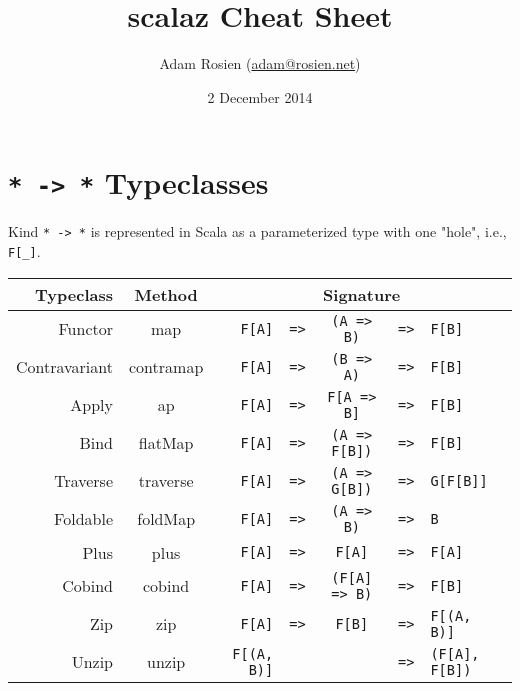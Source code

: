 \documentclass{tufte-handout}
\title{scalaz Cheat Sheet}
\author[Adam Rosien]{Adam Rosien (\href{mailto:adam@rosien.net}{adam@rosien.net})}
\date{2 December 2014}  %
\newcommand{\fa}{\texttt{F[A]}}
\newcommand{\fb}{\texttt{F[B]}}
\newcommand{\rarr}{\texttt{=>}}
\begin{document}
\maketitle%


\section{\texttt{* -> *} Typeclasses}\label{sec:sigs}

Kind \texttt{* -> *} is represented in Scala as a parameterized type with one "hole", i.e., \texttt{F[\_]}.

\begin{table}[ht]
  \centering
  \selectfont
  \begin{tabular}{rcrlccl}
    Typeclass & Method & \multicolumn{5}{c}{Signature} \\
    \midrule
    Functor       & map & \fa & \rarr & \texttt{(A => B)} & \rarr & \fb \\
    Contravariant & contramap & \fa & \rarr & \texttt{(B => A)} & \rarr & \fb \\
    Apply         & ap & \fa & \rarr & \texttt{F[A => B]} & \rarr & \fb \\
    Bind          & flatMap & \fa & \rarr & \texttt{(A => F[B])} & \rarr & \fb \\
    Traverse      & traverse & \fa & \rarr & \texttt{(A => G[B])} & \rarr & \texttt{G[F[B]]} \\
    Foldable      & foldMap & \fa & \rarr & \texttt{(A => B)} & \rarr & \texttt{B} \\
    Plus          & plus & \fa & \rarr & \fa & \rarr & \fa \\
    Cobind        & cobind & \fa & \rarr & \texttt{(F[A] => B)} & \rarr & \fb \\
    Zip           & zip & \fa & \rarr & \fb & \rarr & \texttt{F[(A, B)]} \\
    Unzip         & unzip & \texttt{F[(A, B)]} & & &  \rarr & \texttt{(F[A], F[B])} \\
  \end{tabular}
  \label{tab:normaltab}
\end{table}
\end{document}
